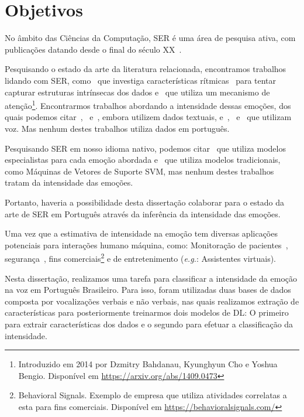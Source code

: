 \section{Objetivos}

No âmbito das Ciências da Computação, \acrshort{SER} é uma área de pesquisa ativa, com publicações datando desde o final do século XX~\cite{12.27}.

Pesquisando o estado da arte da literatura relacionada, encontramos trabalhos lidando com \acrshort{SER}, como~\cite{11} que investiga características rítmicas~\cite{34} para tentar capturar estruturas intrínsecas dos dados e~\cite{32.95} que utiliza um mecanismo de atenção\footnote{Introduzido em 2014 por Dzmitry Bahdanau, Kyunghyun Cho e Yoshua Bengio. Disponível em \url{https://arxiv.org/abs/1409.0473}}. Encontrarmos trabalhos abordando a intensidade dessas emoções, dos quais podemos citar~\cite{14},~\cite{15} e~\cite{28}, embora utilizem dados textuais, e~\cite{3},~\cite{18} e~\cite{20} que utilizam voz. Mas nenhum destes trabalhos utiliza dados em português.

Pesquisando \acrshort{SER} em nosso idioma nativo, podemos citar~\cite{12} que utiliza modelos especialistas para cada emoção abordada e~\cite{21} que utiliza modelos tradicionais, como Máquinas de Vetores de Suporte \acrfull{SVM}, mas nenhum destes trabalhos tratam da intensidade das emoções.

Portanto, haveria a possibilidade desta dissertação colaborar para o estado da arte de \acrshort{SER} em Português através da inferência da intensidade das emoções.

Uma vez que a estimativa de intensidade na emoção tem diversas aplicações potenciais para interações humano máquina, como: Monitoração de pacientes~\cite{1}, segurança~\cite{4}, fins comerciais\footnote{Behavioral Signals. Exemplo de empresa que utiliza atividades correlatas a esta para fins comerciais. Disponível em \url{https://behavioralsignals.com/}} e de entretenimento (\textit{e.g.}: Assistentes virtuais).

Nesta dissertação, realizamos uma tarefa para classificar a intensidade da emoção na voz em Português Brasileiro. Para isso, foram utilizadas duas bases de dados composta por vocalizações verbais e não verbais, nas quais realizamos extração de características para posteriormente treinarmos dois modelos de \acrshort{DL}: O primeiro para extrair características dos dados e o segundo para efetuar a classificação da intensidade.


